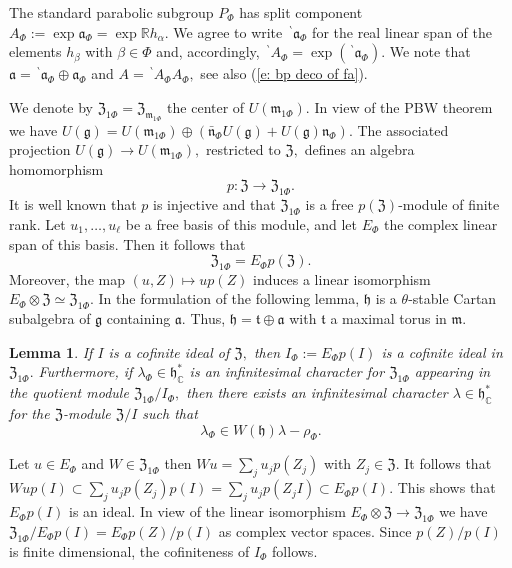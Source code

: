 \documentclass[12pt,a4paper]{article}
\newtheorem{Lemma}[Thm]{Lemma}
\newenvironment{lemma}[0]{\begin{Lemma}\noindent}%
{\end{Lemma}}
\def\proof{\par\noindent{\it Proof.}{\ }{\ }}
\def\msy#1{{\mathbb #1}}
\def\C{{\msy C}}
\def\R{{\msy R}}
\def\ga{\alpha}
\def\gb{\beta}
\def\gl{\lambda}
\def\got#1{\mathfrak #1}
\def\fa{{\got a}}
\def\fg{{\got g}}
\def\fh{{\got h}}
\def\fm{{\got m}}
\def\fn{{\got n}}
\def\ft{{\got t}}
\def\to{\rightarrow}
\def\iC{{\scriptscriptstyle \C}}
\numberwithin{Thm}{section}
\numberwithin{equation}{section}
\def\fZ{{\mathfrak Z}}
\def\fhdc{\fh_\iC^*}
\def\Cartan{\theta}
\numberwithin{equation}{section}
\def\fZ{{\mathfrak Z}}
\def\ft{\mathfrak t}
\def\fhdc{\fh_\iC^*}
\def\bp{\!{\,}^\backprime}
\def\fh{{\mathfrak h}}
\def\Cartan{\theta}
\begin{document}
The standard parabolic subgroup $P_\Phi$ has split component 
$A_\Phi:=  \exp \fa_\Phi = \exp \R h_\ga. $ We agree to write $\bp \fa_\Phi$ 
for the real linear span of the elements $h_\gb$ with $\gb\in \Phi$ and, accordingly,
$\bp A_\Phi= \exp(\bp \fa_\Phi).$  We note that $\fa = \bp \fa_\Phi  \oplus \fa_\Phi$ 
and $A = \bp A_\Phi  A_\Phi,$ see also (\ref{e: bp deco of fa}).

We denote by $\fZ_{1\Phi} = \fZ_{\fm_{1\Phi}}$ the center of $U(\fm_{1\Phi}).$
In view of the PBW theorem we have $U(\fg) = U(\fm_{1\Phi}) \oplus (\bar \fn_\Phi U(\fg) + U(\fg) \fn_\Phi).$ 
The associated projection $U(\fg) \to U(\fm_{1\Phi}),$ restricted to $\fZ,$ defines an 
algebra homomorphism
$$ 
p: \fZ \to \fZ_{1\Phi}.
$$ 
It is well known that $p$ is injective and that $\fZ_{1\Phi}$ is a free $p(\fZ)$-module of finite rank. Let $u_1, \ldots, u_\ell$ be a free basis of this module, and let $E_\Phi$ the complex linear span of this basis.
Then it follows that 
$$ 
\fZ_{1\Phi} = E_\Phi p(\fZ).
$$ 
Moreover, the map $(u, Z)\mapsto  u p(Z)$ induces a linear isomorphism
$
E_\Phi\otimes \fZ \simeq \fZ_{1\Phi}.
$
In the formulation of the following lemma, $\fh$ is a $\Cartan$-stable Cartan subalgebra of 
$\fg$ containing $\fa.$ Thus, $\fh = \ft \oplus \fa$ with $\ft$ a maximal torus in $\fm.$ 

\begin{lemma}
\label{l: weights in quotient center}
If $I$ is a cofinite ideal of $\fZ,$ then $I_\Phi:= E_\Phi p(I)$ is a cofinite ideal in $\fZ_{1\Phi}.$ 
Furthermore, if $\gl_\Phi \in \fhdc$ is an infinitesimal character for $\fZ_{1\Phi}$ appearing in the 
quotient module $\fZ_{1\Phi}/I_\Phi,$ then there exists an infinitesimal character $\gl \in \fhdc$ 
for the $\fZ$-module $\fZ/I$ such that 
\begin{equation}
\gl_\Phi \in W(\fh)\gl - \rho_\Phi.
\end{equation}
\end{lemma}

\proof 
Let $u \in E_\Phi$ and $W \in \fZ_{1\Phi}$ then $W u = \sum_{j} u_j p(Z_j)$ 
with $Z_j \in \fZ.$ It follows that 
$W up(I) \subset \sum_{j} u_j p(Z_j) p(I) = \sum_{j} u_j p(Z_j I) \subset E_\Phi p(I).$ This shows
that $E_\Phi p(I)$ is an ideal. In view of the linear isomorphism $E_\Phi \otimes \fZ \to \fZ_{1\Phi} $ 
we have $\fZ_{1\Phi}/ E_\Phi p(I) = E_\Phi p(Z)/p(I)$ as complex vector spaces.
Since $p(Z)/p(I)$ is finite dimensional, the cofiniteness of $I_\Phi$ follows.
\end{document}
